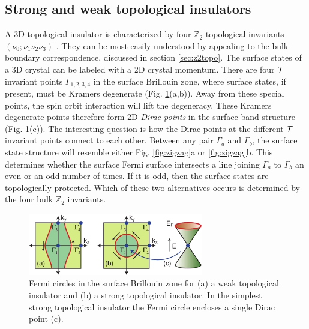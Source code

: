 \documentclass[twocolumn,floatfix,showpacs,rmp,aps]{revtex4}
\begin{document}
	
	\subsection{Strong and weak topological insulators}
	\label{sec:strongweak}
	
	A 3D topological insulator is characterized by four $\mathbb{Z}_2$
	topological invariants $(\nu_0;\nu_1\nu_2\nu_3)$ \cite{fukanemele07,moorebalents07,roy09b}.
	They can be most
	easily understood by appealing to the bulk-boundary correspondence,
	discussed in section \ref{sec:z2topo}.
	The surface states of a 3D crystal
	can be labeled with a 2D crystal
	momentum.  There are four ${\cal T}$ invariant points $\Gamma_{1,2,3,4}$ in the
	surface Brillouin zone, where surface states, if present, must be
	Kramers degenerate (Fig. \ref{fig:surfacebz}(a,b)).  Away from these special points, the spin orbit
	interaction will lift the degeneracy.  These Kramers degenerate
	points therefore form 2D {\it Dirac points} in the surface band
	structure (Fig. \ref{fig:surfacebz}(c)).
	The interesting question is how the Dirac points at the
	different ${\cal T}$ invariant points connect to each other.
	Between any pair $\Gamma_a$ and $\Gamma_b$, the surface state structure will resemble
	either Fig. \ref{fig:zigzag}a or \ref{fig:zigzag}b.  This determines whether the surface Fermi
	surface intersects a line joining $\Gamma_a$ to $\Gamma_b$ an even
	or an odd number of times.  If it is odd, then the surface states are
	topologically protected.  Which of these two alternatives occurs is
	determined by the four bulk $\mathbb{Z}_2$ invariants.
	
	\begin{figure}
		\includegraphics[width=3in]{Fig7}
		\caption{Fermi circles in the surface Brillouin zone for (a) a weak topological insulator and
			(b) a strong topological insulator.  In the simplest strong topological insulator the Fermi circle
			encloses a single Dirac point (c).}
		\label{fig:surfacebz}
	\end{figure}
	
\end{document}
